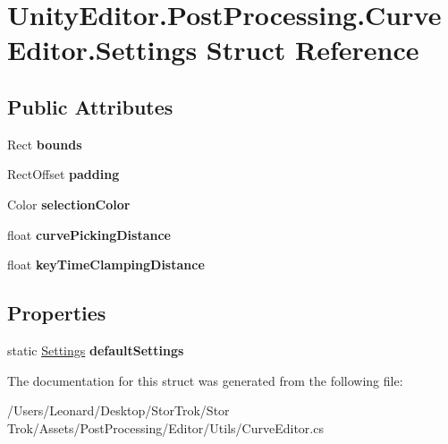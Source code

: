 \hypertarget{struct_unity_editor_1_1_post_processing_1_1_curve_editor_1_1_settings}{}\section{Unity\+Editor.\+Post\+Processing.\+Curve\+Editor.\+Settings Struct Reference}
\label{struct_unity_editor_1_1_post_processing_1_1_curve_editor_1_1_settings}
\subsection*{Public Attributes}
\begin{DoxyCompactItemize}
\item 
\mbox{\label{struct_unity_editor_1_1_post_processing_1_1_curve_editor_1_1_settings_a146ecea52f13c5690007a081577c09d1}} 
Rect {\bfseries bounds}
\item 
\mbox{\label{struct_unity_editor_1_1_post_processing_1_1_curve_editor_1_1_settings_a70cb607e1a1ac18ccbba3bbbfbf4ea69}} 
Rect\+Offset {\bfseries padding}
\item 
\mbox{\label{struct_unity_editor_1_1_post_processing_1_1_curve_editor_1_1_settings_af2ad5ff411e541438041f4ad90f8815a}} 
Color {\bfseries selection\+Color}
\item 
\mbox{\label{struct_unity_editor_1_1_post_processing_1_1_curve_editor_1_1_settings_aacadabfe0ea214d74c5f1742bf7295b0}} 
float {\bfseries curve\+Picking\+Distance}
\item 
\mbox{\label{struct_unity_editor_1_1_post_processing_1_1_curve_editor_1_1_settings_ab4c48700684d8b5dc374b7a03b26f44a}} 
float {\bfseries key\+Time\+Clamping\+Distance}
\end{DoxyCompactItemize}
\subsection*{Properties}
\begin{DoxyCompactItemize}
\item 
\mbox{\label{struct_unity_editor_1_1_post_processing_1_1_curve_editor_1_1_settings_a58c315048e65e1ac57360b771dd55135}} 
static \hyperlink{struct_unity_editor_1_1_post_processing_1_1_curve_editor_1_1_settings}{Settings} {\bfseries default\+Settings}
\end{DoxyCompactItemize}


The documentation for this struct was generated from the following file\+:\begin{DoxyCompactItemize}
\item 
/\+Users/\+Leonard/\+Desktop/\+Stor\+Trok/\+Stor Trok/\+Assets/\+Post\+Processing/\+Editor/\+Utils/Curve\+Editor.\+cs\end{DoxyCompactItemize}
